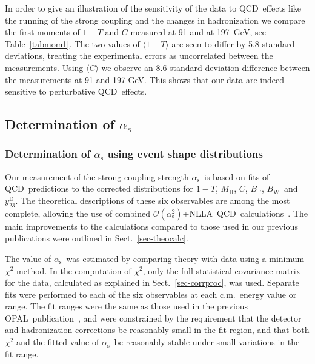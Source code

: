 \documentclass[12pt,a4paper,twoside]{article}
\newcommand{\as}     {\ensuremath{\alpha_{\mathrm{s}}}}
\newcommand{\oaa}    {\ensuremath{\mathcal{O}(\alpha_{\mathrm{s}}^2)}}
\newcommand{\bt}     {\ensuremath{B_{\mathrm{T}}}}
\newcommand{\bw}     {\ensuremath{B_{\mathrm{W}}}}
\newcommand{\cp}     {\ensuremath{C}}
\newcommand{\mh}     {\ensuremath{M_{\mathrm{H}}}}
\newcommand{\thr}    {\ensuremath{1-T}}
\newcommand{\ytwothree}   {\ensuremath{y^{\mathrm{D}}_{23}}}
\newcommand{\bm}[1]  {\mbox{\boldmath\ensuremath{#1}}}
\newcommand{\Opal}{\mbox{\rm OPAL}}
\newcommand{\qcd}{\mbox{QCD}}
\newcommand{\nlla}{\mbox{NLLA}}
\begin{document}
In order to give an illustration of the sensitivity of the data to \qcd\ effects
like the running of the strong coupling and the changes in hadronization
we compare the first moments of $1-T$ and $C$ measured at 91 and at 197~GeV,
see Table~\ref{tabmom1}.  The two values of \mbox{$\langle 1-T \rangle$} 
are seen to differ by 5.8 standard
deviations, treating the experimental errors as 
uncorrelated
between the measurements.  Using $\langle C \rangle$ we observe an 8.6 standard
deviation difference between the measurements at 91 and 197 GeV.  
This shows that our data are indeed sensitive to perturbative 
\qcd\ effects.

%
%
\subsection{ Determination of \bm{\as} }
\label{sec_alphas}
\subsubsection{Determination of \bm{\as} using event shape distributions}
\label{sec_alphas_dist}
Our measurement of the strong coupling strength \as\ is based on
fits of \qcd\ predictions to the corrected distributions for \thr,
\mh, \cp, \bt, \bw\ and \ytwothree.
The theoretical descriptions of
these six observables are among the most complete, allowing the use of
combined \oaa+\nlla\ \qcd\
calculations~\cite{nllathmh,nllabtbw,nllad2,nllay23,nllabtbw2,nllacp}.
The main improvements to the calculations compared to 
those used in our previous publications were outlined 
in Sect.~\ref{sec-theocalc}.

The value of \as\ was estimated
by comparing theory with data using a minimum-$\chi^2$ method.
In the computation
of $\chi^2$, only the full statistical covariance matrix for the data, 
calculated as explained in Sect.~\ref{sec-corrproc}, was used. 
Separate fits were performed to each of the six observables
at each c.m.\ energy value or range.   
The fit ranges were the same as  
those used in the previous \Opal\ publication~\cite{OPALPR303}, 
and were constrained by the
requirement that the detector and hadronization corrections be reasonably 
small in the fit region, and that both $\chi^2$ and the fitted value of
\as\ be reasonably stable under small variations in the fit range.    
\end{document}
